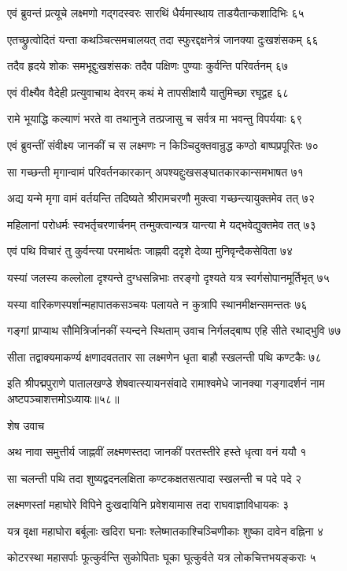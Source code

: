 एवं ब्रुवन्तं प्रत्यूचे लक्ष्मणो गद्गदस्वरः
सारथिं धैर्यमास्थाय ताडयैतान्कशादिभिः ६५

एतच्छ्रुत्वोदितं यन्ता कथञ्चित्समचालयत्
तदा स्फुरद्दक्षनेत्रं जानक्या दुःखशंसकम् ६६

तदैव हृदये शोकः समभूद्दुःखशंसकः
तदैव पक्षिणः पुण्याः कुर्वन्ति परिवर्तनम् ६७

एवं वीक्ष्यैव वैदेही प्रत्युवाचाथ देवरम्
कथं मे तापसीक्षायै यातुमिच्छा रघूद्वह ६८

रामे भूयाद्धि कल्याणं भरते वा तथानुजे
तत्प्रजासु च सर्वत्र मा भवन्तु विपर्ययाः ६९

एवं ब्रुवन्तीं संवीक्ष्य जानकीं च स लक्ष्मणः
न किञ्चिदुक्तवान्रुद्ध कण्ठो बाष्पप्रपूरितः ७०

सा गच्छन्ती मृगान्वामं परिवर्तनकारकान्
अपश्यद्दुःखसङ्घातकारकान्समभाषत ७१

अद्य यन्मे मृगा वामं वर्तयन्ति तदिष्यते
श्रीरामचरणौ मुक्त्वा गच्छन्त्यायुक्तमेव तत् ७२

महिलानां परोधर्मः स्वभर्तृचरणार्चनम्
तन्मुक्त्वान्यत्र यान्त्या मे यद्भवेद्युक्तमेव तत् ७३

एवं पथि विचारं तु कुर्वन्त्या परमार्थतः
जाह्नवी ददृशे देव्या मुनिवृन्दैकसेविता ७४

यस्यां जलस्य कल्लोला दृश्यन्ते दुग्धसन्निभाः
तरङ्गो दृश्यते यत्र स्वर्गसोपानमूर्तिभृत् ७५

यस्या वारिकणस्पर्शान्महापातकसञ्चयः
पलायते न कुत्रापि स्थानमीक्षन्समन्ततः ७६

गङ्गां प्राप्याथ सौमित्रिर्जानकीं स्यन्दने स्थिताम्
उवाच निर्गलद्बाष्प एहि सीते रथाद्भुवि ७७

सीता तद्वाक्यमाकर्ण्य क्षणादवततार सा
लक्ष्मणेन धृता बाहौ स्खलन्ती पथि कण्टकैः ७८

इति श्रीपद्मपुराणे पातालखण्डे शेषवात्स्यायनसंवादे रामाश्वमेधे जानक्या गङ्गादर्शनं नाम अष्टपञ्चाशत्तमोऽध्यायः॥५८॥


शेष उवाच

अथ नावा समुत्तीर्य जाह्नवीं लक्ष्मणस्तदा
जानकीं परतस्तीरे हस्ते धृत्वा वनं ययौ १

सा चलन्ती पथि तदा शुष्यद्वदनलक्षिता
कण्टकक्षतसत्पादा स्खलन्ती च पदे पदे २

लक्ष्मणस्तां महाघोरे विपिने दुःखदायिनि
प्रवेशयामास तदा राघवाज्ञाविधायकः ३

यत्र वृक्षा महाघोरा बर्बूलाः खदिरा घनाः
श्लेष्मातकाश्चिञ्चिणीकाः शुष्का दावेन वह्निना ४

कोटरस्था महासर्पाः फूत्कुर्वन्ति सुकोपिताः
घूका घूत्कुर्वते यत्र लोकचित्तभयङ्कराः ५

